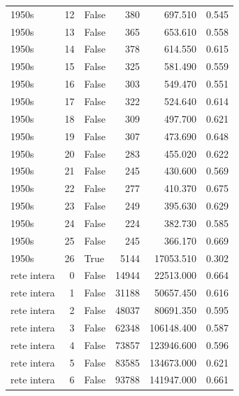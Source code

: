 \begin{table}
\begin{tabular}{lrlrrr}
      1950s &   12 &             False &        380 &       697.510 &     0.545 \\
      1950s &   13 &             False &        365 &       653.610 &     0.558 \\
      1950s &   14 &             False &        378 &       614.550 &     0.615 \\
      1950s &   15 &             False &        325 &       581.490 &     0.559 \\
      1950s &   16 &             False &        303 &       549.470 &     0.551 \\
      1950s &   17 &             False &        322 &       524.640 &     0.614 \\
      1950s &   18 &             False &        309 &       497.700 &     0.621 \\
      1950s &   19 &             False &        307 &       473.690 &     0.648 \\
      1950s &   20 &             False &        283 &       455.020 &     0.622 \\
      1950s &   21 &             False &        245 &       430.600 &     0.569 \\
      1950s &   22 &             False &        277 &       410.370 &     0.675 \\
      1950s &   23 &             False &        249 &       395.630 &     0.629 \\
      1950s &   24 &             False &        224 &       382.730 &     0.585 \\
      1950s &   25 &             False &        245 &       366.170 &     0.669 \\
      1950s &   26 &              True &       5144 &     17053.510 &     0.302 \\
rete intera &    0 &             False &      14944 &     22513.000 &     0.664 \\
rete intera &    1 &             False &      31188 &     50657.450 &     0.616 \\
rete intera &    2 &             False &      48037 &     80691.350 &     0.595 \\
rete intera &    3 &             False &      62348 &    106148.400 &     0.587 \\
rete intera &    4 &             False &      73857 &    123946.600 &     0.596 \\
rete intera &    5 &             False &      83585 &    134673.000 &     0.621 \\
rete intera &    6 &             False &      93788 &    141947.000 &     0.661 \\

\end{tabular}
\end{table}
